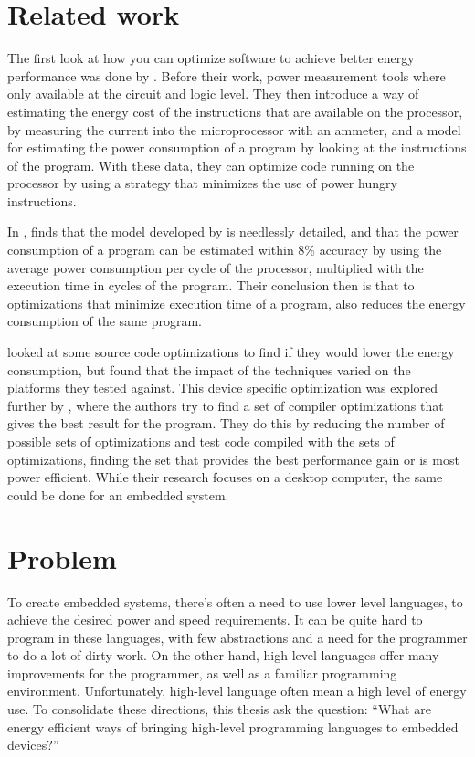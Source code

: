 \section{Related work}
The first look at how you can optimize software to achieve better energy performance was done by \cite{tiwari94}.
Before their work, power measurement tools where only available at the circuit and logic level.
They then introduce a way of estimating the energy cost of the instructions that are available on the processor, by measuring the current into the microprocessor with an ammeter, and a model for estimating the power consumption of a program by looking at the instructions of the program.
With these data, they can optimize code running on the processor by using a strategy that minimizes the use of power hungry instructions.

In \cite{russell98}, finds that the model developed by \cite{tiwari94} is needlessly detailed, and that the power consumption of a program can be estimated within 8\% accuracy by using the average power consumption per cycle of the processor, multiplied with the execution time in cycles of the program.
Their conclusion then is that to optimizations that minimize execution time of a program, also reduces the energy consumption of the same program.

\cite{ortiz08} looked at some source code optimizations to find if they would lower the energy consumption, but found that the impact of the techniques varied on the platforms they tested against.
This device specific optimization was explored further by \cite{delima13}, where the authors try to find a set of compiler optimizations that gives the best result for the program.
They do this by reducing the number of possible sets of optimizations and test code compiled with the sets of optimizations, finding the set that provides the best performance gain or is most power efficient.
While their research focuses on a desktop computer, the same could be done for an embedded system.


\section{Problem}
To create embedded systems, there’s often a need to use lower level languages, to 
achieve the desired power and speed requirements.
It can be quite hard to program in these languages, with few abstractions and a need for the programmer to do a lot of dirty work.
On the other hand, high-level languages offer many improvements for the programmer, as well as a familiar programming environment.
Unfortunately, high-level language often mean a high level of energy use.
To consolidate these directions, this thesis ask the question: “What are energy efficient ways of bringing high-level programming languages to embedded devices?”

